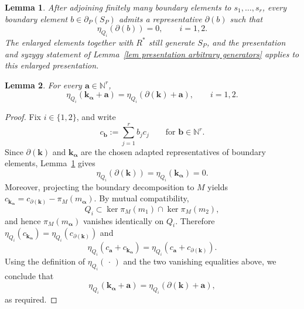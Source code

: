 \documentclass[10pt,a4paper]{amsart}
\newtheorem{lemma}{Lemma}
\newcommand{\NN}{\ensuremath{\mathbb{N}}}
\newcommand{\bfa}{\ensuremath{\mathbf{a}}}
\newcommand{\bfb}{\ensuremath{\mathbf{b}}}
\newcommand{\bfk}{\ensuremath{\mathbf{k}}}
\begin{document}
\begin{lemma}\label{lem adapted boundary representatives}
After adjoining finitely many boundary elements to
\(s_1,\ldots,s_r\), every boundary element
\(b\in\partial_P(S_P)\) admits a representative \(\partial(b)\) such
that
\begin{equation}\label{eq adapted boundary vanishing}
\eta_{Q_i}(\partial(b))=0,
\qquad i=1,2.
\end{equation}
The enlarged elements together with \(R^*\) still generate \(S_P\),
and the presentation and syzygy statement of
Lemma~\ref{lem presentation arbitrary generators} applies to this
enlarged presentation.
\end{lemma}

\begin{lemma}
\label{lem eta compatible boundary}
For every \(\bfa\in\NN^r\),
\[
\eta_{Q_i}(\bfk_{\boldsymbol\alpha}+\bfa)
=
\eta_{Q_i}(\partial(\bfk)+\bfa),
\qquad i=1,2.
\]
\end{lemma}

\begin{proof}
Fix \(i\in\{1,2\}\), and write
\[
c_{\bfb}:=\sum_{j=1}^r b_jc_j
\qquad
\text{for }\bfb\in\NN^r.
\]
Since \(\partial(\bfk)\) and \(\bfk_{\boldsymbol\alpha}\) are the chosen
adapted representatives of boundary elements,
Lemma~\ref{lem adapted boundary representatives} gives
\[
\eta_{Q_i}(\partial(\bfk))
=
\eta_{Q_i}(\bfk_{\boldsymbol\alpha})
=
0.
\]
Moreover, projecting the boundary decomposition to \(M\) yields
$
c_{\bfk_{\boldsymbol\alpha}}
=
c_{\partial(\bfk)}
-
\pi_M(m_{\boldsymbol\alpha}).
$
By mutual compatibility,
\[
Q_i\subset\ker\pi_M(m_1)\cap\ker\pi_M(m_2),
\]
and hence \(\pi_M(m_{\boldsymbol\alpha})\) vanishes identically on
\(Q_i\). Therefore
$
\eta_{Q_i}(c_{\bfk_{\boldsymbol\alpha}})
=
\eta_{Q_i}(c_{\partial(\bfk)})
$
and
\[
\eta_{Q_i}(c_{\bfa}+c_{\bfk_{\boldsymbol\alpha}})
=
\eta_{Q_i}(c_{\bfa}+c_{\partial(\bfk)}).
\]
Using the definition of \(\eta_{Q_i}(\,\cdot\,)\) and the two vanishing
equalities above, we conclude that
\[
\eta_{Q_i}(\bfk_{\boldsymbol\alpha}+\bfa)
=
\eta_{Q_i}(\partial(\bfk)+\bfa),
\]
as required.
\end{proof}
\end{document}
